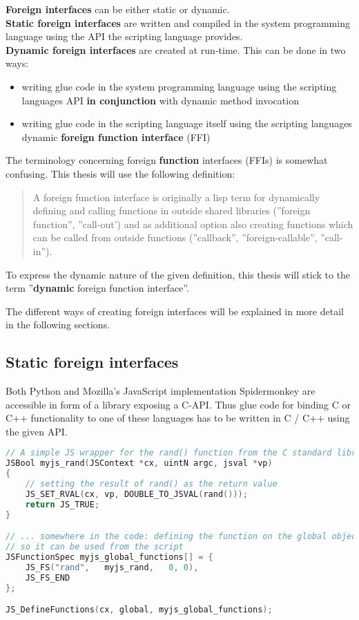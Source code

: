 \textbf{Foreign interfaces} can be either static or dynamic.\\
\textbf{Static foreign interfaces} are written and compiled in the system programming language using the API the scripting language provides.\\
\textbf{Dynamic foreign interfaces} are created at run-time. This can be done in two ways:
\begin{itemize}
\item writing glue code in the system programming language using the scripting languages API \textbf{in conjunction} with dynamic method invocation
\item writing glue code in the scripting language itself using the scripting languages dynamic \textbf{foreign function interface} (FFI)
\end{itemize}

The terminology concerning foreign \textbf{function} interfaces (FFIs) is somewhat confusing. This thesis will use the following definition:

\begin{quotation}
A foreign function interface is originally a lisp term for dynamically defining and calling functions in outside shared libraries (''foreign function'', ''call-out') and as additional option also creating functions which can be called from outside functions (''callback'', ''foreign-callable'', ''call-in'').
\end{quotation}

To express the dynamic nature of the given definition, this thesis will stick to the term ''\textbf{dynamic} foreign function interface''.

The different ways of creating foreign interfaces will be explained in more detail in the following sections.

\newpage
\subsection{Static foreign interfaces}

Both Python and Mozilla's JavaScript implementation Spidermonkey are accessible in form of a library exposing a C-API. Thus glue code for binding C or C++ functionality to one of these languages has to be written in C / C++ using the given API.

\begin{lstlisting}[language=C++, caption=Exposing a C function to Spidermonkey (taken from MDN)]
// A simple JS wrapper for the rand() function from the C standard library
JSBool myjs_rand(JSContext *cx, uintN argc, jsval *vp)
{
    // setting the result of rand() as the return value
    JS_SET_RVAL(cx, vp, DOUBLE_TO_JSVAL(rand()));
    return JS_TRUE;
}

// ... somewhere in the code: defining the function on the global object
// so it can be used from the script
JSFunctionSpec myjs_global_functions[] = {
    JS_FS("rand",   myjs_rand,   0, 0),
    JS_FS_END
};

JS_DefineFunctions(cx, global, myjs_global_functions);
\end{lstlisting}

